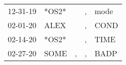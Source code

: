 \begin{supertabular}{p{0.07\textwidth}p{0.06\textwidth}p{0.02\textwidth}p{0.02\textwidth}p{0.06\textwidth}}
          12-31-19\textsuperscript{} &                            *OS2* &                  &             , &           mode\textsuperscript{} \\
          02-01-20\textsuperscript{} &           ALEX\textsuperscript{} &                  &             , &           COND\textsuperscript{} \\
          02-14-20\textsuperscript{} &                            *OS2* &                  &             , &           TIME\textsuperscript{} \\
          02-27-20\textsuperscript{} &           SOME\textsuperscript{} &                , &             , &           BADP\textsuperscript{} \\
\end{supertabular}
